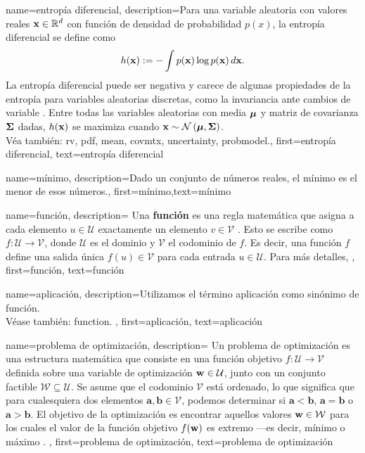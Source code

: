 {name={entropía diferencial},
	description={Para una variable aleatoria con valores reales ${\bf x} \in \mathbb{R}^{d}$ 
		con función de densidad de probabilidad $p(x)$, la entropía diferencial se define como \cite{coverthomas}
		\[
		h({\bf x}) := - \int p({\bf x}) \log p({\bf x}) \, d{\bf x}.
		\]
		La entropía diferencial puede ser negativa y carece de algunas propiedades de la entropía 
		para variables aleatorias discretas, como la invariancia ante cambios de variable \cite{coverthomas}. 
		Entre todas las variables aleatorias con media ${\bm \mu}$ y matriz de covarianza ${\bf \Sigma}$ dadas, 
		$h({\bf x})$ se maximiza cuando ${\bf x} \sim \mathcal{N}\left({\bm \mu},{\bf \Sigma}\right)$. \\
		Véa también: \gls{rv}, \gls{pdf}, \gls{mean}, \gls{covmtx}, \gls{uncertainty}, \gls{probmodel}.},
	first={entropía diferencial},
	text={entropía diferencial}
}


{
	name=mínimo,
	description={Dado un conjunto de números reales, el mínimo es el menor de esos números.},
	first={mínimo},text={mínimo}
}

{name={función},
	description={
		Una \textbf{función} es una regla matemática que asigna a cada 
		elemento $u \in \mathcal{U}$ exactamente un elemento $v \in \mathcal{V}$ \cite{RudinBookPrinciplesMatheAnalysis}. 
		Esto se escribe como $f: \mathcal{U} \rightarrow \mathcal{V}$, donde $\mathcal{U}$ es el dominio 
		y $\mathcal{V}$ el codominio de $f$. Es decir, una función $f$ define una salida única 
		$f(u) \in \mathcal{V}$ para cada entrada $u \in \mathcal{U}$. Para más detalles,
	},
	first={función},
	text={función}
}



{name={aplicación}, 
	description={Utilizamos el término aplicación como sinónimo de función.\\
	Véase también: \gls{function}.
	},
	first={aplicación},
	text={aplicación}
}



{name={problema de optimización},
	description={
		Un problema de optimización es una estructura matemática 
		que consiste en una función objetivo $f: \mathcal{U} \rightarrow \mathcal{V}$ definida 
		sobre una variable de optimización ${\bf w} \in \mathcal{U}$, junto con un conjunto factible 
		$\mathcal{W} \subseteq \mathcal{U}$. Se asume que el codominio $\mathcal{V}$ está ordenado, 
		lo que significa que para cualesquiera dos elementos $\mathbf{a}, \mathbf{b} \in \mathcal{V}$, 
		podemos determinar si $\mathbf{a} < \mathbf{b}$, $\mathbf{a} = \mathbf{b}$ o 
		$\mathbf{a} > \mathbf{b}$. El objetivo de la optimización es encontrar aquellos valores 
		${\bf w} \in \mathcal{W}$ para los cuales el valor de la función objetivo $f({\bf w})$ 
		es extremo —es decir, mínimo o máximo \cite{BoydConvexBook,nesterov04,BertsekasNonLinProgr}.
	},
	first={problema de optimización},
	text={problema de optimización}
}





